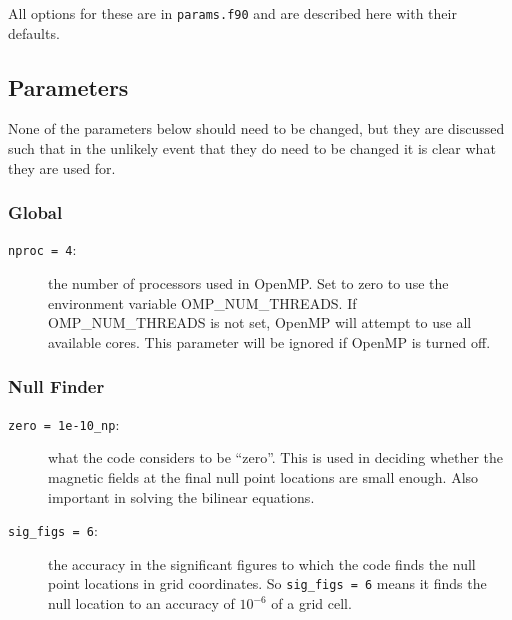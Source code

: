 \documentclass[12pt]{article}
\begin{document}
    All options for these are in \texttt{params.f90} and are described here with their defaults.
    
    \subsection{Parameters}
      \label{sec:params}

      None of the parameters below should need to be changed, but they are discussed such that in the unlikely event that they do need to be changed it is clear what they are used for.
      
      \subsubsection{Global}
        \begin{description}
          \item [\texttt{nproc = 4}:] the number of processors used in OpenMP. Set to zero to use the environment variable OMP\_NUM\_THREADS. If OMP\_NUM\_THREADS is not set, OpenMP will attempt to use all available cores. This parameter will be ignored if OpenMP is turned off.
        \end{description}

      \subsubsection{Null Finder}
        \begin{description}
          \item [\texttt{zero = 1e-10\_np}:] what the code considers to be ``zero''. This is used in deciding whether the magnetic fields at the final null point locations are small enough. Also important in solving the bilinear equations.
          \item [\texttt{sig\_figs = 6}:] the accuracy in the significant figures to which the code finds the null point locations in grid coordinates. So \texttt{sig\_figs = 6} means it finds the null location to an accuracy of \( 10^{-6} \) of a grid cell.
        \end{description}
\end{document}
